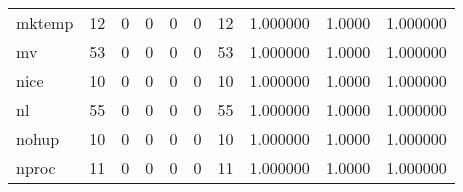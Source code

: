 \begin{tabular}{lrrrrrrrrr}
mktemp    &                                       12 &                                                  0 &                                                  0 &                                                  0 &                                                  0 &                                                 12 &                                           1.000000 &                                 1.0000 &                             1.000000 \\
mv        &                                       53 &                                                  0 &                                                  0 &                                                  0 &                                                  0 &                                                 53 &                                           1.000000 &                                 1.0000 &                             1.000000 \\
nice      &                                       10 &                                                  0 &                                                  0 &                                                  0 &                                                  0 &                                                 10 &                                           1.000000 &                                 1.0000 &                             1.000000 \\
nl        &                                       55 &                                                  0 &                                                  0 &                                                  0 &                                                  0 &                                                 55 &                                           1.000000 &                                 1.0000 &                             1.000000 \\
nohup     &                                       10 &                                                  0 &                                                  0 &                                                  0 &                                                  0 &                                                 10 &                                           1.000000 &                                 1.0000 &                             1.000000 \\
nproc     &                                       11 &                                                  0 &                                                  0 &                                                  0 &                                                  0 &                                                 11 &                                           1.000000 &                                 1.0000 &                             1.000000 \\

\end{tabular}
